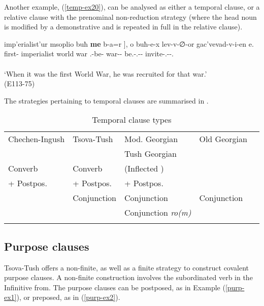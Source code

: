 \begin{enumerate}[label=\Roman*.]
Another example, (\ref{temp-ex20}), can be analysed as either a temporal clause, or a relative clause with the prenominal non-reduction strategy (where the head noun is modified by a demonstrative and is repeated in full in the relative clause).

\begin{exe}
	\ex\label{temp-ex20}
	\gll {{\normalfont[} duiħre-loⁿ} imp'erialist'ur msoplio buħ \textbf{me} {b-a=r {\normalfont]}}, o buħ-e-x lev-v-∅-or gac'vevad-v-i-en e.	\\
	first-{\Adjz} imperialist world war \textbf{{\Subord}} {\B}.{\Sg}-be-{\Imprf} {\Dist} war-{\Obl}-{\Cont} be.{\Nw}-{\M}.{\Sg}-{\Tr}-{\Imprf} invite-{\M}.{\Sg}-{\Tr}-{\Ptcp}.{\Pst} {\Prox} \\
	\\
		\trans `When it was the first World War, he was recruited for that war.' \\
		\hfill (E113-75)
	\end{exe}
\end{enumerate}


The strategies pertaining to temporal clauses are summarised in .

\begin{table}
	\begin{tabular}{lllll}
    \lsptoprule
		Chechen-Ingush  & {Tsova-Tush} & {Mod. Georgian} &  {Old Georgian} \\
		& & {Tush Georgian} & \\
		\midrule
		Converb & Converb & (Inflected {\Vn}) &  \\
		{\Vn} + Postpos. & {\Vn} + Postpos. & {\Vn} + Postpos. &  \\
		& Conjunction & Conjunction   & Conjunction  \\	
		& & Conjunction \textit{ro(m)}  & \\
        \lspbottomrule
	\end{tabular}
	\caption{Temporal clause types}
	\label{temp-table1}
\end{table}



\subsection{Purpose clauses}\label{purp}

Tsova-Tush offers a non-finite, as well as a finite strategy to construct covalent purpose clauses. A non-finite construction involves the subordinated verb in the Infinitive from. The purpose clauses can be postposed, as in Example (\ref{purp-ex1}), or preposed, as in (\ref{purp-ex2}).


